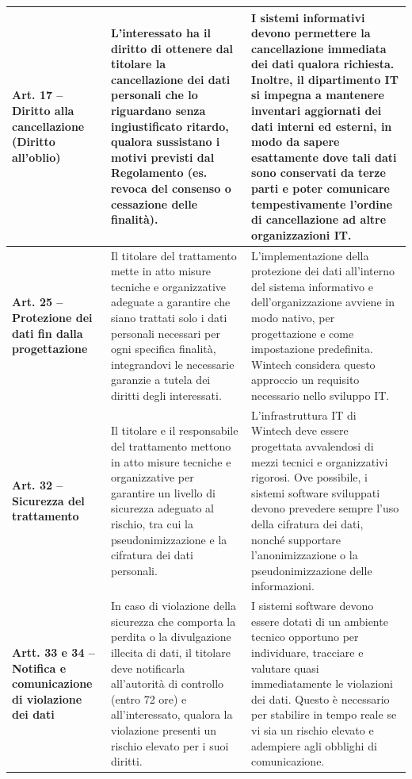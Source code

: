 \begin{longtable}{ >{\raggedright\arraybackslash}p{} p{} p{} }
    \textbf{Art. 17 -- Diritto alla cancellazione (Diritto all'oblio)} & L'interessato ha il diritto di ottenere dal titolare la cancellazione dei dati personali che lo riguardano senza ingiustificato ritardo, qualora sussistano i motivi previsti dal Regolamento (es. revoca del consenso o cessazione delle finalità). & I sistemi informativi devono permettere la cancellazione immediata dei dati qualora richiesta. Inoltre, il dipartimento IT si impegna a mantenere inventari aggiornati dei dati interni ed esterni, in modo da sapere esattamente dove tali dati sono conservati da terze parti e poter comunicare tempestivamente l'ordine di cancellazione ad altre organizzazioni IT.\\ \midrule
    \textbf{Art. 25 -- Protezione dei dati fin dalla progettazione} & Il titolare del trattamento mette in atto misure tecniche e organizzative adeguate a garantire che siano trattati solo i dati personali necessari per ogni specifica finalità, integrandovi le necessarie garanzie a tutela dei diritti degli interessati. & L'implementazione della protezione dei dati all'interno del sistema informativo e dell'organizzazione avviene in modo nativo, per progettazione e come impostazione predefinita. Wintech considera questo approccio un requisito necessario nello sviluppo IT.\\ \midrule
    \textbf{Art. 32 -- Sicurezza del trattamento} & Il titolare e il responsabile del trattamento mettono in atto misure tecniche e organizzative per garantire un livello di sicurezza adeguato al rischio, tra cui la pseudonimizzazione e la cifratura dei dati personali. & L'infrastruttura IT di Wintech deve essere progettata avvalendosi di mezzi tecnici e organizzativi rigorosi. Ove possibile, i sistemi software sviluppati devono prevedere sempre l'uso della cifratura dei dati, nonché supportare l'anonimizzazione o la pseudonimizzazione delle informazioni.\\ \midrule
    \textbf{Artt. 33 e 34 -- Notifica e comunicazione di violazione dei dati} & In caso di violazione della sicurezza che comporta la perdita o la divulgazione illecita di dati, il titolare deve notificarla all'autorità di controllo (entro 72 ore) e all'interessato, qualora la violazione presenti un rischio elevato per i suoi diritti. & I sistemi software devono essere dotati di un ambiente tecnico opportuno per individuare, tracciare e valutare quasi immediatamente le violazioni dei dati. Questo è necessario per stabilire in tempo reale se vi sia un rischio elevato e adempiere agli obblighi di comunicazione.\\
\end{longtable}

